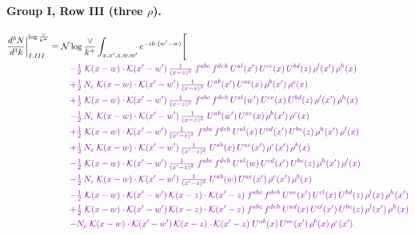 \documentclass[10pt]{article}
\numberwithin{equation}{section}
\newcommand{\NNv}{\mathcal N\log\frac{\vee}{k^+}}
\begin{document}
\paragraph{Group I, Row III (three $\rho$).}
\begin{align}
\frac{d^3N}{d^3k}\bigg|^{\log\frac{\vee}{k^+}}_{I.III}={}&\NNv\int_{x,x',z,w,w'}e^{-ik\cdot(w'-w)}\Bigg[\notag\\
&\quad{\color{CC}-\tfrac{1}{2}\;\mathcal{K}(x-w)\cdot\mathcal{K}(x'-w')\,\tfrac{1}{(x-z)^{2}}\;f^{abc}\,f^{deh}\,U^{al}(x')\,U^{ce}(x)\,U^{bd}(z)\,\rho^{l}(x')\,\rho^{h}(x)}\notag\\
&\quad{\color{CC}+\tfrac{1}{2}\,N_c\;\mathcal{K}(x-w)\cdot\mathcal{K}(x'-w')\,\tfrac{1}{(x-z)^{2}}\;U^{ab}(x')\,U^{ac}(x)\,\rho^{b}(x')\,\rho^{c}(x)}\notag\\
&\quad{\color{CC}+\tfrac{1}{2}\;\mathcal{K}(x-w)\cdot\mathcal{K}(x'-w')\,\tfrac{1}{(x-z)^{2}}\;f^{abc}\,f^{deh}\,U^{al}(w')\,U^{ce}(x)\,U^{bd}(z)\,\rho^{l}(x')\,\rho^{h}(x)}\notag\\
&\quad{\color{CC}-\tfrac{1}{2}\,N_c\;\mathcal{K}(x-w)\cdot\mathcal{K}(x'-w')\,\tfrac{1}{(x-z)^{2}}\;U^{ab}(w')\,U^{ac}(x)\,\rho^{b}(x')\,\rho^{c}(x)}\notag\\
&\quad{\color{CC}+\tfrac{1}{2}\;\mathcal{K}(x-w)\cdot\mathcal{K}(x'-w')\,\tfrac{1}{(x'-z)^{2}}\;f^{abc}\,f^{deh}\,U^{al}(x)\,U^{cd}(x')\,U^{be}(z)\,\rho^{h}(x')\,\rho^{l}(x)}\notag\\
&\quad{\color{CC}+\tfrac{1}{2}\,N_c\;\mathcal{K}(x-w)\cdot\mathcal{K}(x'-w')\,\tfrac{1}{(x'-z)^{2}}\;U^{ab}(x)\,U^{ac}(x')\,\rho^{c}(x')\,\rho^{b}(x)}\notag\\
&\quad{\color{CC}-\tfrac{1}{2}\;\mathcal{K}(x-w)\cdot\mathcal{K}(x'-w')\,\tfrac{1}{(x'-z)^{2}}\;f^{abc}\,f^{deh}\,U^{al}(w)\,U^{cd}(x')\,U^{be}(z)\,\rho^{h}(x')\,\rho^{l}(x)}\notag\\
&\quad{\color{CC}-\tfrac{1}{2}\,N_c\;\mathcal{K}(x-w)\cdot\mathcal{K}(x'-w')\,\tfrac{1}{(x'-z)^{2}}\;U^{ab}(w)\,U^{ac}(x')\,\rho^{c}(x')\,\rho^{b}(x)}\notag\\
&\quad{\color{CC}-\tfrac{1}{2}\;\mathcal{K}(x-w)\cdot\mathcal{K}(x'-w')\,\mathcal{K}(x-z)\cdot\mathcal{K}(x'-z)\;f^{abc}\,f^{deh}\,U^{ae}(x')\,U^{cl}(x)\,U^{bd}(z)\,\rho^{l}(x)\,\rho^{h}(x')}\notag\\
&\quad{\color{CC}+\tfrac{1}{2}\;\mathcal{K}(x-w)\cdot\mathcal{K}(x'-w')\,\mathcal{K}(x-z)\cdot\mathcal{K}(x'-z)\;f^{abc}\,f^{deh}\,U^{ad}(x)\,U^{cl}(x')\,U^{be}(z)\,\rho^{l}(x')\,\rho^{h}(x)}\notag\\
&\quad{\color{CC}-N_c\;\mathcal{K}(x-w)\cdot\mathcal{K}(x'-w')\,\mathcal{K}(x-z)\cdot\mathcal{K}(x'-z)\;U^{ab}(x)\,U^{ac}(x')\,\rho^{b}(x)\,\rho^{c}(x')}\notag\\

\end{align}
\end{document}
